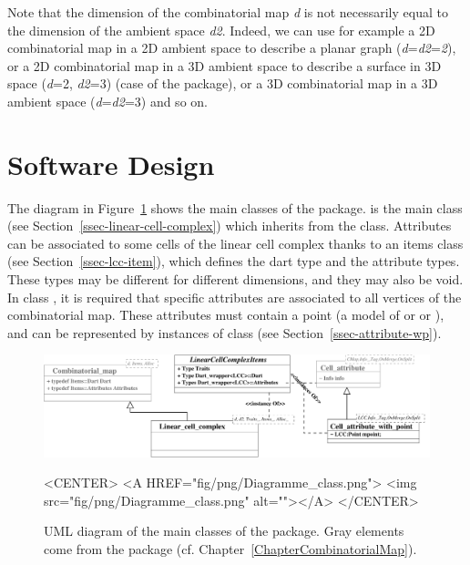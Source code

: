 Note that the dimension of the combinatorial map \emph{d} is not
necessarily equal to the dimension of the ambient space
\emph{d2}. Indeed, we can use for example a 2D combinatorial map in a
2D ambient space to describe a planar graph
(\emph{d}=\emph{d2}=\emph{2}), or a 2D combinatorial map in a 3D
ambient space to describe a surface in 3D space (\emph{d}=2,
\emph{d2}=3) (case of the  package), or a 3D
combinatorial map in a 3D ambient space (\emph{d}=\emph{d2}=3) and so
on.

\section{Software Design}

The diagram in Figure~\ref{fig-diagram_class_lcc} shows the main
classes of the package.   is the main
class (see Section~\ref{ssec-linear-cell-complex}) which inherits from
the  class.  Attributes can be associated
to some cells of the linear cell complex thanks to an items class (see
Section~\ref{ssec-lcc-item}), which defines the dart type and the
attribute types. These types may be different for different
dimensions, and they may also be void.  In class
, it is required that
specific attributes are associated to all vertices of the
combinatorial map. These attributes must contain a point (a model of
 or  or ),
and can be represented by instances of class
 (see
Section~\ref{ssec-attribute-wp}).
%
\begin{figure}
  \begin{ccTexOnly}
    \begin{center}
      \includegraphics[width=.95\textwidth]
      {Linear_cell_complex/fig/pdf/Diagramme_class}
    \end{center}
  \end{ccTexOnly}
  \begin{ccHtmlOnly}
    <CENTER>
    <A HREF="fig/png/Diagramme_class.png">
        <img src="fig/png/Diagramme_class.png" alt=""></A>
    </CENTER>
    \end{ccHtmlOnly}
    \caption{UML diagram of the main classes of the package. Gray
      elements come from the  package 
      (cf. Chapter~\ref{ChapterCombinatorialMap}).}
    \label{fig-diagram_class_lcc}
\end{figure}

